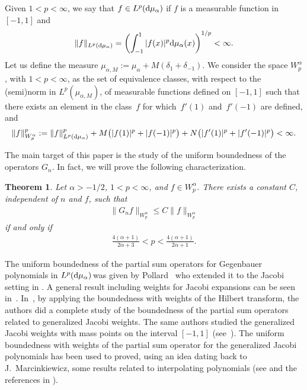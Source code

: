 \documentclass[11pt]{article}
\newtheorem{thm}{Theorem}[section]
\numberwithin{equation}{section}
\begin{document}
Given $1< p<\infty$, we say that $f\in L^p({\rm d}\mu_{\alpha})$ if $f$ is a measurable function in~$[-1,1]$ and
\begin{gather*}
\|f\|_{L^p({\rm d}\mu_{\alpha})}=\left(\int_{-1}^1 |f(x)|^p {\rm d}\mu_{\alpha}(x)\right)^{1/p}<\infty.
\end{gather*}
Let us define the measure $\mu_{\alpha,M} := \mu_\alpha+M(\delta_1+\delta_{-1})$. We consider the space $W_p^{\alpha}$, with $1< p<\infty$, as the set of equivalence classes, with respect to the (semi)norm in $L^p(\mu_{\alpha,M})$, of measurable functions defined on $[-1,1]$ such that there exists an element in the class~$f$ for which~$f'(1)$ and~$f'(-1)$ are defined, and
\begin{gather*}
\|f\|_{W_p^{\alpha}}^p:=\|f\|_{L^p({\rm d}\mu_{\alpha})}^p+M\big(|f(1)|^p+|f(-1)|^p\big) +N\big(|f'(1)|^p+|f'(-1)|^p\big)<\infty.
\end{gather*}

The main target of this paper is the study of the uniform boundedness of the operators $G_n$. In fact, we will prove the following characterization.
\begin{thm}\label{main}
	Let $\alpha>-1/2$, $1<p<\infty$, and $f\in W_p^{\alpha}$. There exists a constant $C$, independent of $n$ and $f$, such that
	\begin{gather*}%
	\|G_nf\|_{W_p^{\alpha}}\le C\|f\|_{W_p^{\alpha}}
	\end{gather*}
	if and only if
	\begin{gather}\label{acotacionp}
	\frac{4(\alpha+1)}{2\alpha+3}<p<\frac{4(\alpha+1)}{2\alpha+1}.
	\end{gather}
\end{thm}

The uniform boundedness of the partial sum operators for Gegenbauer polynomials in $L^p({\rm d}\mu_{\alpha})\!$ was given by Pollard~\cite{PollardII} who extended it to the Jacobi setting in \cite{PollardIII}. A general result including weights for Jacobi expansions can be seen in~\cite{muckenhoupt}. In~\cite{GPRV1}, by applying the boundedness with weights of the Hilbert transform, the authors did a complete study of the boundedness of the partial sum operators related to generalized Jacobi weights. The same authors studied the generalized Jacobi weights with mass points on the interval $[-1,1]$ (see~\cite{GPRV2}). The uniform boundedness with weights of the partial sum operator for the generalized Jacobi polynomials has been used to proved, using an idea dating back to J.~Marcinkiewicz, some results related to interpolating polynomials (see \cite{Xu-93,Xu-94} and the references in \cite{Nevai}).
\end{document}
